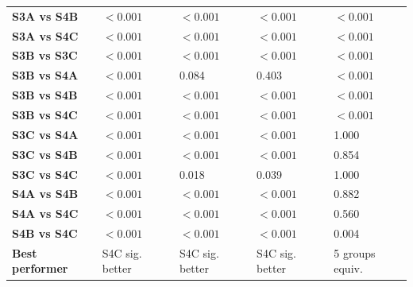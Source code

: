 \begin{table}[H]
{\begin{tabular}{lllll}
        \textbf{S3A vs S4B} & $< 0.001$ & $< 0.001$ & $< 0.001$ & $< 0.001$ \\
        \textbf{S3A vs S4C} & $< 0.001$ & $< 0.001$ & $< 0.001$ & $< 0.001$ \\
        \textbf{S3B vs S3C} & $< 0.001$ & $< 0.001$ & $< 0.001$ & $< 0.001$ \\
        \textbf{S3B vs S4A} & $< 0.001$ & 0.084 & 0.403 & $< 0.001$ \\
        \textbf{S3B vs S4B} & $< 0.001$ & $< 0.001$ & $< 0.001$ & $< 0.001$ \\
        \textbf{S3B vs S4C} & $< 0.001$ & $< 0.001$ & $< 0.001$ & $< 0.001$ \\
        \textbf{S3C vs S4A} & $< 0.001$ & $< 0.001$ & $< 0.001$ & 1.000 \\
        \textbf{S3C vs S4B} & $< 0.001$ & $< 0.001$ & $< 0.001$ & 0.854 \\
        \textbf{S3C vs S4C} & $< 0.001$ & 0.018 & 0.039 & 1.000 \\
        \textbf{S4A vs S4B} & $< 0.001$ & $< 0.001$ & $< 0.001$ & 0.882 \\
        \textbf{S4A vs S4C} & $< 0.001$ & $< 0.001$ & $< 0.001$ & 0.560 \\
        \textbf{S4B vs S4C} & $< 0.001$ & $< 0.001$ & $< 0.001$ & 0.004 \\
        \textbf{Best performer} & S4C sig. better & S4C sig. better & S4C sig. better & 5 groups equiv. \\
        \bottomrule
    \end{tabular}}
\end{table}